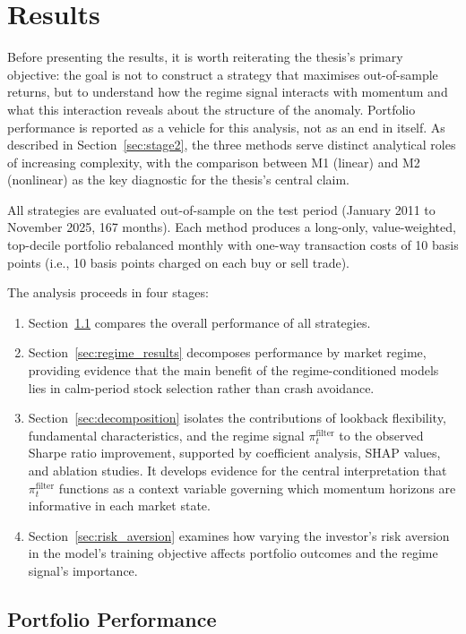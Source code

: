 \section{Results}\label{sec:results}

Before presenting the results, it is worth reiterating the thesis's primary objective: the goal is not to construct a strategy that maximises out-of-sample returns, but to understand how the regime signal interacts with momentum and what this interaction reveals about the structure of the anomaly. Portfolio performance is reported as a vehicle for this analysis, not as an end in itself. As described in Section~\ref{sec:stage2}, the three methods serve distinct analytical roles of increasing complexity, with the comparison between M1 (linear) and M2 (nonlinear) as the key diagnostic for the thesis's central claim.

All strategies are evaluated out-of-sample on the test period (January 2011 to November 2025, 167 months). Each method produces a long-only, value-weighted, top-decile portfolio rebalanced monthly with one-way transaction costs of 10 basis points (i.e., 10 basis points charged on each buy or sell trade). 

The analysis proceeds in four stages:
\begin{enumerate}
    \item Section~\ref{sec:performance_results} compares the overall performance of all strategies.
    \item Section~\ref{sec:regime_results} decomposes performance by market regime, providing evidence that the main benefit of the regime-conditioned models lies in calm-period stock selection rather than crash avoidance.
    \item Section~\ref{sec:decomposition} isolates the contributions of lookback flexibility, fundamental characteristics, and the regime signal $\pi_t^{\text{filter}}$ to the observed Sharpe ratio improvement, supported by coefficient analysis, SHAP values, and ablation studies. It develops evidence for the central interpretation that $\pi_t^{\text{filter}}$ functions as a context variable governing which momentum horizons are informative in each market state.
    \item Section~\ref{sec:risk_aversion} examines how varying the investor's risk aversion in the model's training objective affects portfolio outcomes and the regime signal's importance.
\end{enumerate}

\subsection{Portfolio Performance}\label{sec:performance_results}

